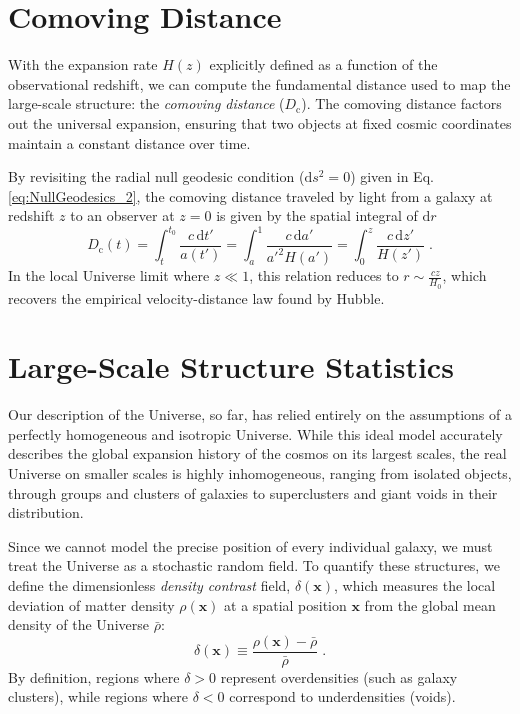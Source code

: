 \documentclass[12pt,a4paper,oneside]{report}
\begin{document}
\section{Comoving Distance}\label{sec:Comoving_Distance}
With the expansion rate $H(z)$ explicitly defined as a function of the observational redshift, we can compute the fundamental distance used to map the large-scale structure: the \textit{comoving distance} ($D_\mathrm{c}$). The comoving distance factors out the universal expansion, ensuring that two objects at fixed cosmic coordinates maintain a constant distance over time.

By revisiting the radial null geodesic condition ($\mathrm{d} s^2 = 0$) given in Eq. \eqref{eq:NullGeodesics_2}, the comoving distance traveled by light from a galaxy at redshift $z$ to an observer at $z=0$ is given by the spatial integral of $\mathrm{d} r$
\begin{equation}
  D_{\mathrm{c}}(t) = \int_{t}^{t_0} \frac{c \, \mathrm{d} t'}{a(t')} = \int_{a}^{1} \frac{c \, \mathrm{d} a'}{a'^2 H(a')} = \int_{0}^{z} \frac{c \, \mathrm{d} z'}{H(z')} \; .
  \label{eq:ComovingDistance}
\end{equation}
In the local Universe limit where $z \ll 1$, this relation reduces to $r \sim \frac{c z}{H_0}$, which recovers the empirical velocity-distance law found by Hubble.

\section{Large-Scale Structure Statistics}\label{sec:LSStructureStatistics}
Our description of the Universe, so far, has relied entirely on the assumptions of a perfectly homogeneous and isotropic Universe. While this ideal model accurately describes the global expansion history of the cosmos on its largest scales, the real Universe on smaller scales is highly inhomogeneous, ranging from isolated objects, through groups and clusters of galaxies to superclusters and giant voids in their distribution.

Since we cannot model the precise position of every individual galaxy, we must treat the Universe as a stochastic random field. To quantify these structures, we define the dimensionless \textit{density contrast} field, $\delta(\mathbf{x})$, which measures the local deviation of matter density $\rho(\mathbf{x})$ at a spatial position $\mathbf{x}$ from the global mean density of the Universe $\bar{\rho}$:
\begin{equation}
  \delta(\mathbf{x}) \equiv \frac{\rho(\mathbf{x}) - \bar{\rho}}{\bar{\rho}} \; .
  \label{eq:DensityContrast}
\end{equation}
By definition, regions where $\delta > 0$ represent overdensities (such as galaxy clusters), while regions where $\delta < 0$ correspond to underdensities (voids).
\end{document}
